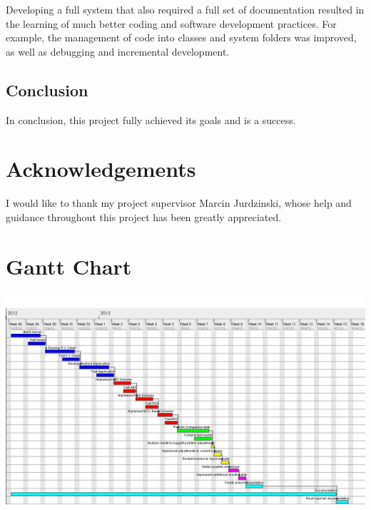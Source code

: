 \documentclass[a4paper,12pt]{report}
\begin{document}
Developing a full system that also required a full set of documentation resulted in the learning of much better coding and software development practices. For example, the management of code into classes and system folders was improved, as well as debugging and incremental development. 

\section{Conclusion}

In conclusion, this project fully achieved its goals and is a success.

\chapter{Acknowledgements}

I would like to thank my project supervisor Marcin Jurdzinski, whose help and guidance throughout this project has been greatly appreciated.

\appendix
\chapter{Gantt Chart}\label{A}
\includegraphics[scale=0.4, angle=270]{images/ProgReportChart.jpg}



\end{document}
